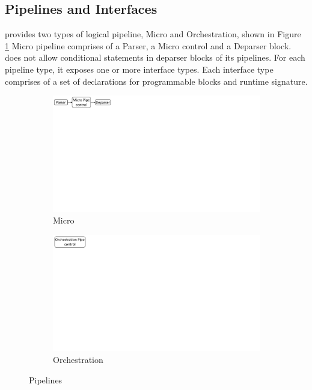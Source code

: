 \documentclass[letterpaper,twocolumn,10pt]{article}
\begin{document}
\subsection{Pipelines and Interfaces}
\label{sec:pipelines}
\uarch provides two types of logical pipeline, Micro and Orchestration, shown in Figure \ref{fig:msa-pipelines}
Micro pipeline comprises of a Parser, a Micro control and a Deparser block.
\uarch does not allow conditional statements in deparser blocks of its pipelines.
For each pipeline type, it exposes one or more interface types.
Each interface type comprises of a set of declarations for programmable blocks and runtime signature.
\begin{figure}[ht]
    \centering
    \begin{subfigure}{0.59\linewidth}
        \centering
        \includegraphics[trim=0 482 692 0, clip,scale=0.45]{msa-pipeline}
        \caption{Micro}
    \end{subfigure}\vline
    \begin{subfigure}{0.41\linewidth}
        \centering
        \includegraphics[trim=0 480 805 0,clip,scale=0.45]{micro-orchestration-pipeline}
        \caption{Orchestration}
    \end{subfigure}
\caption{\uarch Pipelines}
\label{fig:msa-pipelines}
\end{figure}
\end{document}
